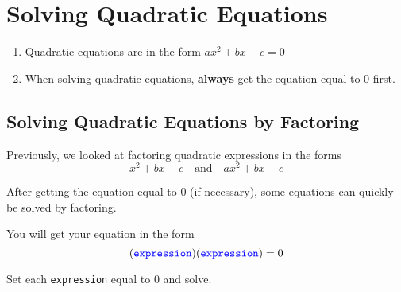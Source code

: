 \documentclass{article}
\begin{document}
\section*{Solving Quadratic Equations}

\begin{tcolorbox}[colframe=orange!70!white, coltitle=black, title=\textbf{Summary}]
\begin{enumerate}
    \item Quadratic equations are in the form $ax^2 + bx + c = 0$
    \item When solving quadratic equations, \textbf{always} get the equation equal to 0 first.
\end{enumerate}
\end{tcolorbox}

\subsection*{Solving Quadratic Equations by Factoring}

Previously, we looked at factoring quadratic expressions in the forms
\[
x^2 + bx + c \quad \mathrm{and} \quad ax^2 + bx + c
\]
\smallskip 

\parbox{3in}{After getting the equation equal to 0 (if necessary), some equations can quickly be solved by factoring.}
\bigskip 

You will get your equation in the form
\[
({\color{blue}\texttt{expression}})({\color{blue}\texttt{expression}}) = 0
\]

Set each {\color{blue}\texttt{expression}} equal to 0 and solve.
\bigskip 

\end{document}
